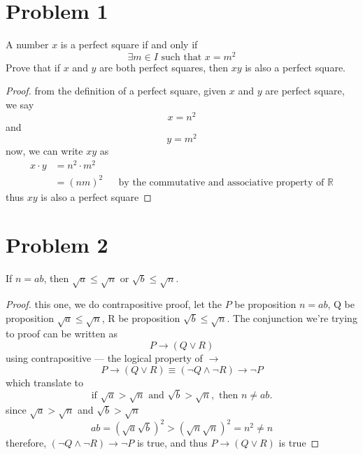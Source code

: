 \newcommand{\hmwkTitle}{Homework 1}
\newcommand{\hmwkDueDate}{Tuesday, January 27, 2026}
\newcommand{\hmwkHeaderTitle}{ICCS206 Discrete Mathematic: Homework 1}


\section*{Problem 1}
A number $x$ is a perfect square if and only if 
\[\exists m \in I \text{ such that } x = m^2\]
Prove that if $x$ and $y$ are both perfect squares, then $xy$ is also a perfect square.


\medskip
\solution

 \begin{proof}
  from the definition of a perfect square, given $x$ and $y$ are
  perfect square, we say
  \[
  x = n^2
  \]
  and
  \[
  y = m^2
  \]
  now, we can write $xy$ as
  \begin{align*}
  x \cdot y &= n^2 \cdot m^2\\
  &= (nm)^2 && \text{by the commutative and associative property
  of }\mathbb{R}
  \end{align*}
  thus $xy$ is also a perfect square
  \end{proof}

\vspace{1em}
\hrulefill


\section*{Problem 2}
If $n = ab$, then $\sqrt{a} \le \sqrt{n}$ or $\sqrt{b} \le \sqrt{n}$.

\medskip
\solution

\begin{proof}
  this one, we do contrapositive proof, let the $P$ be proposition $n
  = ab$, Q be proposition $\sqrt{a} \le \sqrt{n}$, R be proposition $
  \sqrt{b} \le \sqrt{n}$. The conjunction we're trying to proof can be
  written as
  \[
  P \to (Q \lor R)
  \]
    using contrapositive --- the logical property of $\to$
  \[
  P \to (Q \lor R) \equiv (\neg Q \land \neg R) \to \neg P
  \]
  which translate to
  \[
  \text{if }\sqrt{a} > \sqrt{n}\text{ and }\sqrt{b} > \sqrt{n},
  \text{ then }n \ne ab.
  \]
  since $\sqrt{a} > \sqrt{n}$ and $\sqrt{b} > \sqrt{n}$
  \[
  ab = (\sqrt{a}\sqrt{b})^2 > (\sqrt{n}\sqrt{n})^2 = n^2 \ne n
  \]
  therefore, $(\neg Q \land \neg R) \to \neg P$ is true, and thus $P \to (Q
  \lor R)$ is true
  \end{proof}

